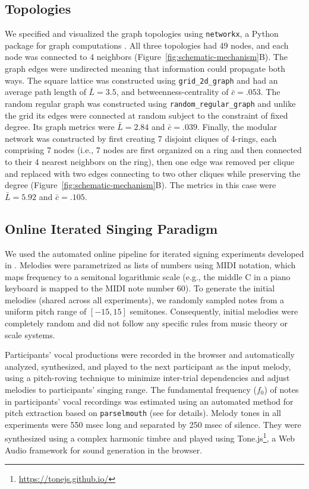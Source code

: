 \documentclass[10pt,letterpaper]{article}
\begin{document}
\subsection{Topologies}
We specified and visualized the graph topologies using \texttt{networkx}, a Python package for graph computations \cite{hagberg2008exploring}. All three topologies had 49 nodes, and each node was connected to 4 neighbors (Figure~\ref{fig:schematic-mechanism}B). The graph edges were undirected meaning that information could propagate both ways. The square lattice was constructed using \texttt{grid\_2d\_graph} and had an average path length of $\bar{L}=3.5$, and betweenness-centrality of $\bar{c}=.053$. The random regular graph was constructed using \texttt{random\_regular\_graph} and unlike the grid its edges were connected at random subject to the constraint of fixed degree. Its graph metrics were $\bar{L}=2.84$ and $\bar{c}=.039$. Finally, the modular network \cite{lynn2020humans} was constructed by first creating 7 disjoint cliques of 4-rings, each comprising 7 nodes (i.e., 7 nodes are first organized on a ring and then connected to their 4 nearest neighbors on the ring), then one edge was removed per clique and replaced with two edges connecting to two other cliques while preserving the degree (Figure~\ref{fig:schematic-mechanism}B). The metrics in this case were $\bar{L}=5.92$ and $\bar{c}=.105$.

\subsection{Online Iterated Singing Paradigm}
We used the automated online pipeline for iterated signing experiments developed in . Melodies were parametrized as lists of numbers using MIDI notation, which maps frequency to a semitonal logarithmic scale (e.g.,  the middle C in a piano keyboard is mapped to the MIDI note number 60). To generate the initial melodies (shared across all experiments), we randomly sampled notes from a uniform pitch range of $[-15, 15]$ semitones. Consequently, initial melodies were completely random and did not follow any specific rules from music theory or scale systems. 

Participants' vocal productions were recorded in the browser and automatically analyzed, synthesized, and played to the next participant as the input melody, using a pitch-roving technique to minimize inter-trial dependencies and adjust melodies to participants’ singing range. The fundamental frequency ($f_0$) of notes in participants' vocal recordings was estimated using an automated method for pitch extraction based on \texttt{parselmouth} \cite{jadoul2018introducing} (see  for details).
Melody tones in all experiments were 550 msec long and separated by 250 msec of silence. They were synthesized using a complex harmonic timbre and played using Tone.js\footnote{\url{https://tonejs.github.io/}}, a Web Audio framework for sound generation in the browser.
\end{document}
